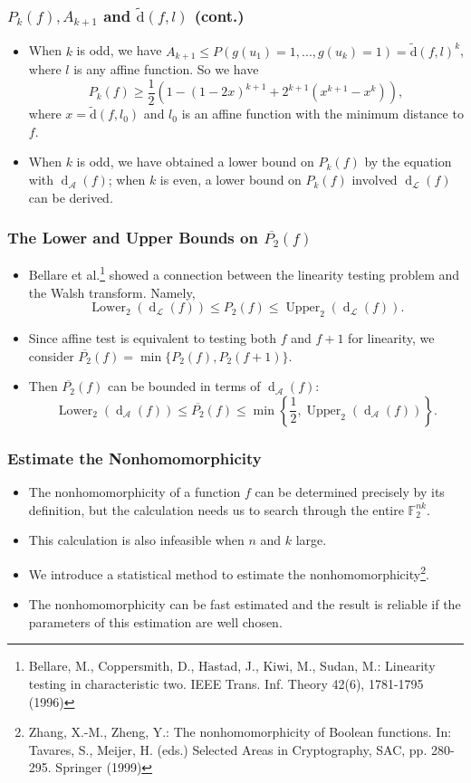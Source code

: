 \documentclass[
    aspectratio=169,                   %
]{beamer}
\newcommand{\F}{\mathbb{F}}
\newcommand{\dis}{\operatorname{\widetilde{d}}}
\newcommand{\nnl}{\operatorname{d}_{\mathcal{A}}}
\newcommand{\disl}{\operatorname{d}_{\mathcal{L}}}
\begin{document}
    \begin{frame}
        \frametitle{$P_k(f),A_{k+1}$ and $\dis(f,l)$ (cont.)}
    
        \begin{itemize}
            \item When $k$ is odd, we have $A_{k+1}\le P(g(u_1)=1,...,g(u_k)=1)=\dis(f,l)^k$, where $l$ is any affine function. So we have 
            \[P_k(f)\ge\frac{1}{2}\left( 1-(1-2x)^{k+1}+2^{k+1}(x^{k+1}-x^k)\right),\]
            where $x=\dis(f,l_0)$ and $l_0$ is an affine function with the minimum distance to $f$.
            \item When $k$ is odd, we have obtained a lower bound on $P_k(f)$ by the equation with $\nnl(f)$; when $k$ is even, a lower bound on $P_k(f)$ involved $\disl(f)$ can be derived.
        \end{itemize}
    \end{frame}
\begin{frame}
        \frametitle{The Lower and Upper Bounds on $\overline{P_2}(f)$}
        \begin{itemize}
            \item Bellare et al.\footnote{Bellare, M., Coppersmith, D., H$\mathring{\text{a}}$stad, J., Kiwi, M., Sudan, M.: Linearity testing in characteristic two. IEEE Trans. Inf. Theory 42(6), 1781-1795 (1996)} showed a connection between the linearity testing problem and the Walsh transform.
            Namely, \[\operatorname{Lower}_2(\disl(f))\le P_2(f)\le \operatorname{Upper}_2(\disl(f)).\]
            \item Since affine test is equivalent to testing both $f$ and $f + 1$ for linearity, we consider $\overline{P_2}(f)=\min\{P_2(f),P_2(f+1)\}$.
            \item Then $\overline{P_2}(f)$ can be bounded in terms of $\nnl(f)$:
            \[\operatorname{Lower}_2(\nnl(f))\le \overline{P_2}(f)\le\min\left\{ \frac{1}{2},  \operatorname{Upper}_2(\nnl(f))\right\}.\]
        \end{itemize}
    \end{frame}
    \begin{frame}
        \frametitle{Estimate the Nonhomomorphicity}
        \begin{itemize}
            \item The nonhomomorphicity of a function $f$ can be determined precisely by its definition, but the calculation needs us to search through the entire $\F_2^{nk}$.
            \item This calculation is also infeasible when $n$ and $k$ large. 
            \item We introduce a statistical method to estimate the nonhomomorphicity\footnote{Zhang, X.-M., Zheng, Y.: The nonhomomorphicity of Boolean functions. In: Tavares, S., Meijer,
            H. (eds.) Selected Areas in Cryptography, SAC, pp. 280-295. Springer (1999)}.
            \item The nonhomomorphicity can be fast estimated and the result is reliable if the parameters of this estimation are well chosen.
        \end{itemize}
    
    \end{frame}
    
\end{document}
